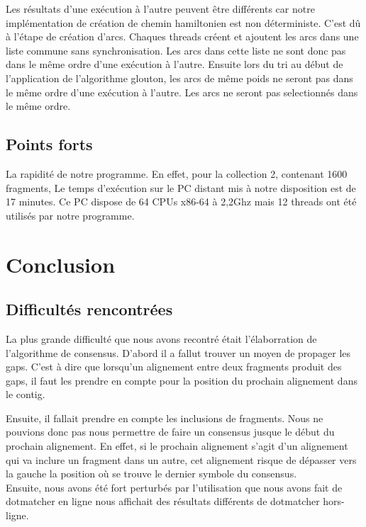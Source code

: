 \documentclass[a4paper, 12pt, titlepage]{article}
\begin{document}
Les résultats d'une exécution à l'autre peuvent être différents car notre implémentation de création de chemin hamiltonien est non déterministe.
C'est dû à l'étape de création d'arcs.
Chaques threads créent et ajoutent les arcs dans une liste commune sans synchronisation.
Les arcs dans cette liste ne sont donc pas dans le même ordre d'une exécution à l'autre.
Ensuite lors du tri au début de l'application de l'algorithme glouton, les arcs de même poids ne seront pas dans le même ordre d'une exécution à l'autre.
Les arcs ne seront pas selectionnés dans le même ordre.

\subsection*{Points forts}
La rapidité de notre programme. En effet, pour la collection 2, contenant 1600 fragments,
Le temps d'exécution sur le PC distant mis à notre disposition est de 17 minutes.
Ce PC dispose de 64 CPUs x86-64 à 2,2Ghz mais 12 threads ont été utilisés par notre programme.

\section{Conclusion}
\subsection{Difficultés rencontrées}
La plus grande difficulté que nous avons recontré était l'élaborration de l'algorithme de consensus.
D'abord il a fallut trouver un moyen de propager les gaps.
C'est à dire que lorsqu'un alignement entre deux fragments produit des gaps, il faut les prendre en compte pour la position du prochain alignement dans le contig.

Ensuite, il fallait prendre en compte les inclusions de fragments.
Nous ne pouvions donc pas nous permettre de faire un consensus jusque le début du prochain alignement.
En effet, si le prochain alignement s'agit d'un alignement qui va inclure un fragment dans un autre, cet alignement risque de dépasser vers la gauche la position où se trouve le dernier symbole du consensus.\\

Ensuite, nous avons été fort perturbés par l'utilisation que nous avons fait de dotmatcher en ligne nous affichait des résultats différents de dotmatcher hors-ligne.
\end{document}

